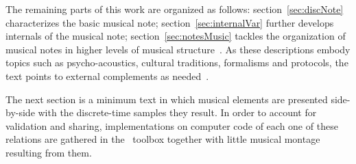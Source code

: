 The remaining parts of this work are organized as follows: section~\ref{sec:discNote} characterizes the basic musical note; section~\ref{sec:internalVar} further develops internals of the musical note; section~\ref{sec:notesMusic} tackles the organization of musical notes in higher levels of musical structure~\cite{Wisnick,Webern,Lerdahl,Cook,Lacerda}. As these descriptions embody topics such as psycho-acoustics, cultural traditions, formalisms and protocols, the text points to external complements as needed~\cite{Zamacois,Schoenberg,microsound}.

The next section is a minimum text in which musical elements are presented side-by-side with the discrete-time samples they result. In order to account for validation and sharing, implementations on computer code of each one of these relations are gathered in the \massa\ toolbox together with little musical montage resulting from them.





